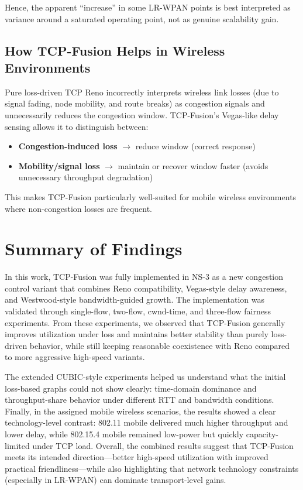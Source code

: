 \documentclass[12pt,a4paper]{article}
\begin{document}
Hence, the apparent ``increase'' in some LR-WPAN points is best interpreted as variance around a saturated operating point, not as genuine scalability gain.

\subsection{How TCP-Fusion Helps in Wireless Environments}

Pure loss-driven TCP Reno incorrectly interprets wireless link losses (due to signal fading, node mobility, and route breaks) as congestion signals and unnecessarily reduces the congestion window. TCP-Fusion's Vegas-like delay sensing allows it to distinguish between:

\begin{itemize}
    \item \textbf{Congestion-induced loss} $\rightarrow$ reduce window (correct response)
    \item \textbf{Mobility/signal loss} $\rightarrow$ maintain or recover window faster (avoids unnecessary throughput degradation)
\end{itemize}

This makes TCP-Fusion particularly well-suited for mobile wireless environments where non-congestion losses are frequent.




\section{Summary of Findings}

In this work, TCP-Fusion was fully implemented in NS-3 as a new congestion control variant that combines Reno compatibility, Vegas-style delay awareness, and Westwood-style bandwidth-guided growth. The implementation was validated through single-flow, two-flow, cwnd-time, and three-flow fairness experiments. From these experiments, we observed that TCP-Fusion generally improves utilization under loss and maintains better stability than purely loss-driven behavior, while still keeping reasonable coexistence with Reno compared to more aggressive high-speed variants.

The extended CUBIC-style experiments helped us understand what the initial loss-based graphs could not show clearly: time-domain dominance and throughput-share behavior under different RTT and bandwidth conditions. Finally, in the assigned mobile wireless scenarios, the results showed a clear technology-level contrast: 802.11 mobile delivered much higher throughput and lower delay, while 802.15.4 mobile remained low-power but quickly capacity-limited under TCP load. Overall, the combined results suggest that TCP-Fusion meets its intended direction---better high-speed utilization with improved practical friendliness---while also highlighting that network technology constraints (especially in LR-WPAN) can dominate transport-level gains.
\end{document}
